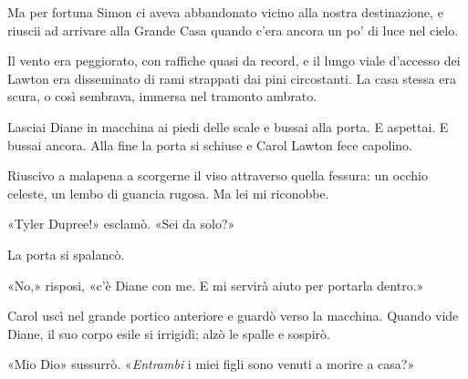 Ma per fortuna Simon ci aveva abbandonato vicino alla nostra
destinazione, e riuscii ad arrivare alla Grande Casa quando c'era ancora
un po' di luce nel cielo.

Il vento era peggiorato, con raffiche quasi da record, e il lungo viale
d'accesso dei Lawton era disseminato di rami strappati dai pini
circostanti. La casa stessa era scura, o così sembrava, immersa nel
tramonto ambrato.

Lasciai Diane in macchina ai piedi delle scale e bussai alla porta. E
aspettai. E bussai ancora. Alla fine la porta si schiuse e Carol Lawton
fece capolino.

Riuscivo a malapena a scorgerne il viso attraverso quella fessura: un
occhio celeste, un lembo di guancia rugosa. Ma lei mi riconobbe.

«Tyler Dupree!» esclamò. «Sei da solo?»

La porta si spalancò.

«No,» risposi, «c'è Diane con me. E mi servirà aiuto per portarla
dentro.»

Carol uscì nel grande portico anteriore e guardò verso la macchina.
Quando vide Diane, il suo corpo esile si irrigidì; alzò le spalle e
sospirò.

«Mio Dio» sussurrò. «\emph{Entrambi} i miei figli sono venuti a morire a
casa?»
